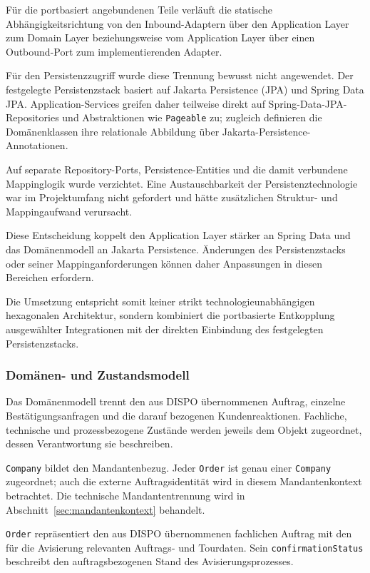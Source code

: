 \documentclass[
  12pt,
  a4paper,
  oneside
]{article}
\begin{document}
Für die portbasiert angebundenen Teile verläuft die statische
Abhängigkeitsrichtung von den Inbound-Adaptern über den Application Layer zum
Domain Layer beziehungsweise vom Application Layer über einen Outbound-Port
zum implementierenden Adapter.

Für den Persistenzzugriff wurde diese Trennung bewusst nicht angewendet. Der
festgelegte Persistenzstack basiert auf Jakarta Persistence (JPA) und Spring
Data JPA. Application-Services greifen daher teilweise direkt auf
Spring-Data-JPA-Repositories und Abstraktionen wie \texttt{Pageable} zu;
zugleich definieren die Domänenklassen ihre relationale Abbildung über
Jakarta-Persistence-Annotationen.

Auf separate Repository-Ports, Persistence-Entities und die damit verbundene
Mappinglogik wurde verzichtet. Eine Austauschbarkeit der Persistenztechnologie
war im Projektumfang nicht gefordert und hätte zusätzlichen Struktur- und
Mappingaufwand verursacht.

Diese Entscheidung koppelt den Application Layer stärker an Spring Data und
das Domänenmodell an Jakarta Persistence. Änderungen des Persistenzstacks oder
seiner Mappinganforderungen können daher Anpassungen in diesen Bereichen
erfordern.

Die Umsetzung entspricht somit keiner strikt technologieunabhängigen
hexagonalen Architektur, sondern kombiniert die portbasierte Entkopplung
ausgewählter Integrationen mit der direkten Einbindung des festgelegten
Persistenzstacks.

\subsubsection{Domänen- und Zustandsmodell}
\label{sec:domaenenmodell}

Das Domänenmodell trennt den aus DISPO übernommenen Auftrag, einzelne
Bestätigungsanfragen und die darauf bezogenen Kundenreaktionen. Fachliche,
technische und prozessbezogene Zustände werden jeweils dem Objekt zugeordnet,
dessen Verantwortung sie beschreiben.

\texttt{Company} bildet den Mandantenbezug. Jeder \texttt{Order} ist genau
einer \texttt{Company} zugeordnet; auch die externe Auftragsidentität wird in
diesem Mandantenkontext betrachtet. Die technische Mandantentrennung wird in
Abschnitt~\ref{sec:mandantenkontext} behandelt.

\texttt{Order} repräsentiert den aus DISPO übernommenen fachlichen Auftrag mit
den für die Avisierung relevanten Auftrags- und Tourdaten. Sein
\texttt{confirmationStatus} beschreibt den auftragsbezogenen Stand des
Avisierungsprozesses.
\end{document}
